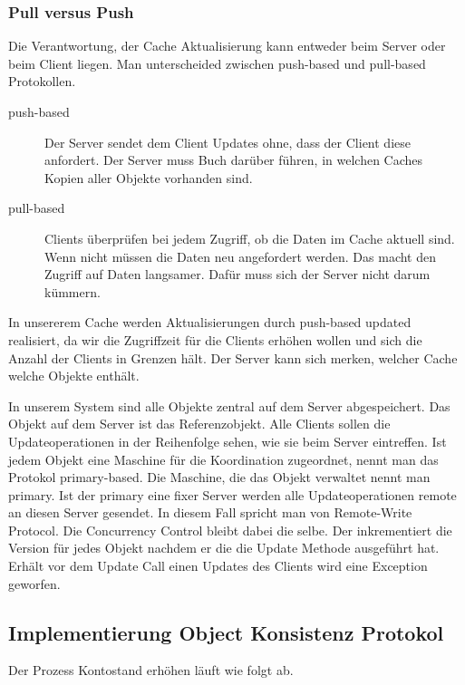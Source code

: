 \subsubsection{Pull versus Push}
\label{sec:pull-versus-push}

Die Verantwortung, der Cache Aktualisierung kann entweder beim Server oder beim Client liegen. Man unterscheided zwischen push-based und pull-based Protokollen.

\begin{description}
\item[push-based] Der Server sendet dem Client Updates ohne, dass der Client diese anfordert. Der Server muss Buch darüber führen, in welchen Caches Kopien aller Objekte vorhanden sind.
\item[pull-based] Clients überprüfen bei jedem Zugriff, ob die Daten im Cache aktuell sind. Wenn nicht müssen die Daten neu angefordert werden. Das macht den Zugriff auf Daten langsamer. Dafür muss sich der Server nicht darum kümmern.
\end{description}

In unsererem Cache werden Aktualisierungen durch push-based updated realisiert, da wir die Zugriffzeit für die Clients erhöhen wollen und sich die Anzahl der Clients in Grenzen hält. Der Server kann sich merken, welcher Cache welche Objekte enthält.

In unserem System sind alle Objekte zentral auf dem Server abgespeichert. Das Objekt auf dem Server ist das Referenzobjekt. Alle Clients sollen die Updateoperationen in der Reihenfolge sehen, wie sie beim Server eintreffen. Ist jedem Objekt eine Maschine für die Koordination zugeordnet, nennt man das Protokol primary-based. Die Maschine, die das Objekt verwaltet nennt man primary. Ist der primary eine fixer Server werden alle Updateoperationen remote an diesen Server gesendet. In diesem Fall spricht man von Remote-Write Protocol. Die Concurrency Control bleibt dabei die selbe. Der inkrementiert die Version für jedes Objekt nachdem er die die Update Methode ausgeführt hat. Erhält vor dem Update Call einen Updates des Clients wird eine Exception geworfen.

\subsection{Implementierung Object Konsistenz Protokol}
\label{sec:impl-object-kons}

Der Prozess Kontostand erhöhen läuft wie folgt ab.

